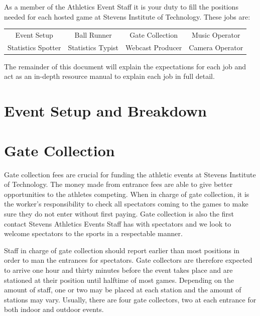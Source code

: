 \documentclass{article}
\begin{document}
    As a member of the Athletics Event Staff it is your duty to fill the positions needed for each hosted game at Stevens Institute of Technology. These jobs are:
    
\def\arraystretch{2}
\begin{table}[h]
    \centering
    \begin{tabular}{cccc}
        Event Setup & Ball Runner & Gate Collection & Music Operator \\
        Statistics Spotter & Statistics Typist & Webcast Producer & Camera Operator\\
        
    \end{tabular}
\end{table}

The remainder of this document will explain the expectations for each job and act as an in-depth resource manual to explain  each job in full detail.
\newpage
{}


\section{Event Setup and Breakdown}

\section{Gate Collection}
Gate collection fees are crucial for funding the athletic events at Stevens Institute of Technology. The money made from entrance fees are able to give better opportunities to the athletes competing. When in charge of gate collection, it is the worker’s responsibility to check all spectators coming to the games to make sure they do not enter without first paying. Gate collection is also the first contact Stevens Athletics Events Staff has with spectators and we look to welcome spectators to the sports in a respectable manner.
\newline

Staff in charge of gate collection should report earlier than most positions in order to man the entrances for spectators. Gate collectors are therefore expected to arrive one hour and thirty minutes before the event takes place and are stationed at their position until halftime of most games. Depending on the amount of staff, one or two may be placed at each station and the amount of stations may vary. Usually, there are four gate collectors, two at each entrance for both indoor and outdoor events.
\newline
\end{document}
